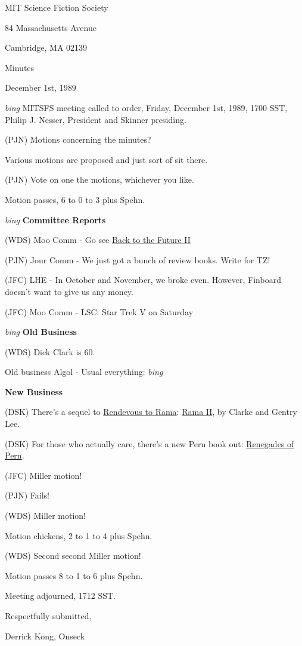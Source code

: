 \setlength{\topmargin}{-0.5in}
\setlength{\oddsidemargin}{-0.60in}
\setlength{\textheight}{9in}
\setlength{\textwidth}{6.5in}



\begin{center}
MIT Science Fiction Society

84 Massachusetts Avenue

Cambridge, MA 02139

\vspace{0.2in}
Minutes

December 1st, 1989

\end{center}
 
\vspace{0.15in}
{\em bing\/}  MITSFS meeting called to order, Friday, December 1st, 1989,
1700 SST, Philip J. Nesser, President and Skinner presiding.

(PJN) Motions concerning the minutes?

Various motions are proposed and just sort of sit there.

(PJN) Vote on one the motions, whichever you like.

Motion passes, 6 to 0 to 3 plus Spehn.

{\em bing\/}  {\bf Committee Reports}

(WDS) Moo Comm - Go see \underline{Back to the Future II}

(PJN) Jour Comm - We just got a bunch of review books.  Write for TZ!

(JFC) LHE - In October and November, we broke even.  However, Finboard
doesn't want to give us any money.

(JFC) Moo Comm - LSC: Star Trek V on Saturday

\vspace{0.15in}
{\em bing\/}  {\bf Old Business}

(WDS) Dick Clark is 60.

Old business Algol - Usual everything: {\em bing\/}

\vspace{0.15in}
{\bf New Business}

(DSK) There's a sequel to \underline{Rendevous to Rama}:
\underline{Rama II}, by Clarke and Gentry Lee.

(DSK) For those who actually care, there's a new Pern book out:
\underline{Renegades of Pern}.

(JFC) Miller motion!

(PJN) Fails!

(WDS) Miller motion!

Motion chickens, 2 to 1 to 4 plus Spehn.

(WDS) Second second Miller motion!

Motion passes 8 to 1 to 6 plus Spehn.

Meeting adjourned, 1712 SST.

\vspace{0.15in}
\begin{center}
Respectfully submitted,

Derrick Kong, Onseck
\end{center}

